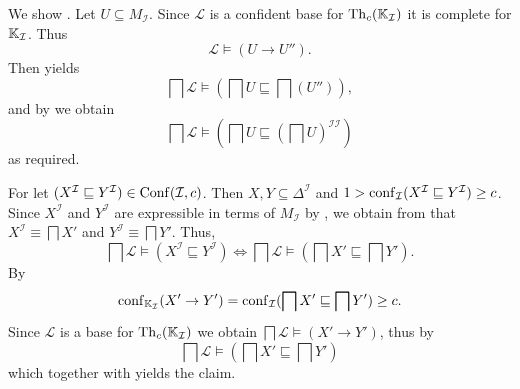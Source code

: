 \begin{Proof}
  We show .  Let $U \subseteq M_{\mathcal{I}}$.  Since $\mathcal{L}$ is a
  confident base for $\operatorname{Th}_c({\mathbb{K}}_{\mathcal{I}})$ it is complete for ${\mathbb{K}}_{\mathcal{I}}$.  Thus
  \begin{equation*}
    \mathcal{L} \models (U \to U'').
  \end{equation*}
  Then  yields
  \begin{equation*}
    \bigsqcap \mathcal{L} \models (\bigsqcap U \sqsubseteq \bigsqcap (U'')),
  \end{equation*}
  and by  we obtain
  \begin{equation*}
    \bigsqcap \mathcal{L} \models (\bigsqcap U \sqsubseteq (\bigsqcap U)^{\mathcal{I}\mathcal{I}})
  \end{equation*}
  as required.

  For  let $(X^{\mathcal{I}} \sqsubseteq Y^{\mathcal{I}}) \in
  \operatorname{Conf}(\mathcal{I}, c)$.  Then $X, Y \subseteq \Delta^{\mathcal{I}}$ and $1 >
  \operatorname{conf}_{\mathcal{I}}(X^{\mathcal{I}} \sqsubseteq Y^{\mathcal{I}}) \ge c$.  Since
  $X^{\mathcal{I}}$ and $Y^{\mathcal{I}}$ are expressible in terms of $M_{\mathcal{I}}$ by
  , we obtain from
   that $X^{\mathcal{I}} \equiv \bigsqcap X'$ and
  $Y^{\mathcal{I}} \equiv \bigsqcap Y'$.  Thus,
  \begin{equation}
    \label{eq:27}
    \bigsqcap \mathcal{L} \models (X^{\mathcal{I}} \sqsubseteq Y^{\mathcal{I}}) \iff
    \bigsqcap \mathcal{L} \models (\bigsqcap X' \sqsubseteq \bigsqcap Y').
  \end{equation}
  By 
  \begin{equation*}
    \operatorname{conf}_{{\mathbb{K}}_{\mathcal{I}}}(X' \to Y') = \operatorname{conf}_{\mathcal{I}}(\bigsqcap X' \sqsubseteq
    \bigsqcap Y') \ge c.
  \end{equation*}
  Since $\mathcal{L}$ is a base for $\operatorname{Th}_c({\mathbb{K}}_{\mathcal{I}})$ we obtain $\bigsqcap
  \mathcal{L} \models (X' \to Y')$, thus by
  \begin{equation*}
    \bigsqcap \mathcal{L} \models (\bigsqcap X' \sqsubseteq \bigsqcap Y')
  \end{equation*}
  which together with  yields the claim.
\end{Proof}

